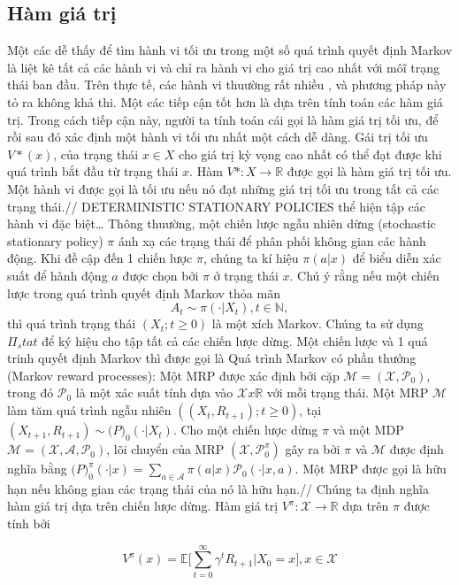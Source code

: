 \documentclass[14pt,a4paper,oneside]{report}		%
\begin{document}
\subsection{Hàm giá trị}
Một các dễ thấy để tìm hành vi tối ưu trong một số quá trình quyết định Markov là liệt kê tất cả các hành vi và chỉ ra hành vi cho giá trị cao nhất với môĩ trạng thái ban đầu. Trên thực tế, các hành vi thuường rất nhiều , và phương pháp này tỏ ra không khả thi. Một các tiếp cận tốt hơn là dựa trên tính toán các hàm giá trị. Trong cách tiếp cận này, người ta tính toán cái gọi là hàm giá trị tối ưu, để rồi sau đó xác định một hành vi tối ưu nhất một cách dễ dàng.
Gái trị tối ưu $V*(x)$, của trạng thái $x \in X$ cho giá trị kỳ vọng cao nhất có thể đạt được khi quá trình bắt đầu từ trạng thái $x$. Hàm $V* : X \rightarrow \mathbb{R}$ được gọi là hàm giá trị tối ưu. Một hành vi được gọi là tối ưu nếu nó đạt  những giá trị tối ưu trong tất cả các trạng thái.//
DETERMINISTIC STATIONARY POLICIES thể hiện tập các hành vi đặc biệt…
Thông thuường, một chiến lược ngẫu nhiên dừng (stochastic stationary policy) $\pi$ ánh xạ các trạng thái để phân phối không gian các hành động. Khi đề cập đến 1 chiến lược $\pi$, chúng ta kí hiệu $\pi (a|x)$ để biểu diễn xác suất để hành động $a$ được chọn bởi $\pi$ ở trạng thái $x$. Chú ý rằng nếu một chiến lược trong quá trình quyết định Markov thỏa mãn 
$$A_t  \sim \pi (\cdotp | X_t),  t \in \mathbb{N},$$ thì quá trình trạng thái $(X_t; t \geq 0)$ là một xích Markov. Chúng ta sử dụng $\Pi_stat$ để ký hiệu cho tập tất cả các chiến lược dừng.  Một chiến lược và 1 quá trinh quyết định Markov thì được gọi là Quá trình Markov có phần thưởng (Markov reward processes): Một MRP được xác định bởi cặp $\mathcal{M} = (\mathcal{X},\mathcal{P}_0)$, trong đó $\mathcal{P}_0$ là một xác suất tính dựa vào $\mathcal{X} x \mathbb{R}$ với mỗi trạng thái. Một MRP $\mathcal{M}$ làm tăm quá trình ngẫu nhiên $((X_t,R_{t+1});t\geq 0)$, tại $(X_{t+1},R_{t+1}) \sim \mathcal(P)_0(\cdotp | X_t)$. Cho một chiến lược dừng $\pi$ và một MDP $\mathcal{M} = (\mathcal{X},\mathcal{A},\mathcal{P}_0)$, lõi chuyển của MRP $(\mathcal{X},\mathcal{P}^\pi_0)$ gây ra bởi $\pi$ và $\mathcal{M}$ được định nghĩa bằng $\mathcal(P)^\pi_0(\cdotp|x) = \sum_{a \in \mathcal{A}} \pi(a|x)\mathcal{P}_0(\cdotp|x,a)$. Một MRP được gọi là hữu hạn nếu không gian các trạng thái của nó là hữu hạn.//
Chúng ta định nghĩa hàm giá trị dựa trên chiến lược dừng. Hàm giá trị $V^\pi:\mathcal{X}\rightarrow\mathbb{R}$ dựa trên $\pi$ được tính bởi 

\begin{equation} \label{eq7}
V^\pi(x)=\mathbb{E}\bigg[\displaystyle\sum^\infty_{t=0}{\gamma^tR_{t+1}|X_0=x}\bigg], x\in\mathcal{X}
\end{equation}
\end{document}
